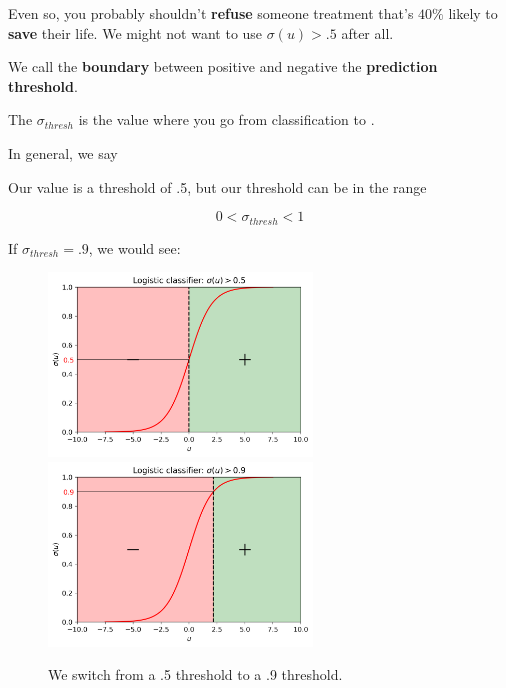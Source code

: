         Even so, you probably shouldn't \textbf{refuse} someone treatment that's $40\%$ likely to \textbf{save} their life. We might not want to use $\sigma(u)>.5$ after all.
        
        We call the \textbf{boundary} between positive and negative the \textbf{prediction threshold}.\\
        
        \begin{definition}
            The  $\sigma_{thresh}$ is the value where you go from  classification to .
            
            In general, we say
            
            
            
            Our  value is a threshold of .5, but our threshold can be  in the range
            
            \begin{equation*}
                0 < \sigma_{thresh} < 1
            \end{equation*}
        \end{definition}
        
        \miniex If $\sigma_{thresh}=.9$, we would see:
        
        \begin{figure}[H]
            
            \includegraphics[width=70mm,scale=0.5]{images/classification_images/sigmoid_.5.png}
            \includegraphics[width=70mm,scale=0.5]{images/classification_images/sigmoid_.9.png}
            \caption*{We switch from a .5 threshold to a .9 threshold.}

        \end{figure}
        
